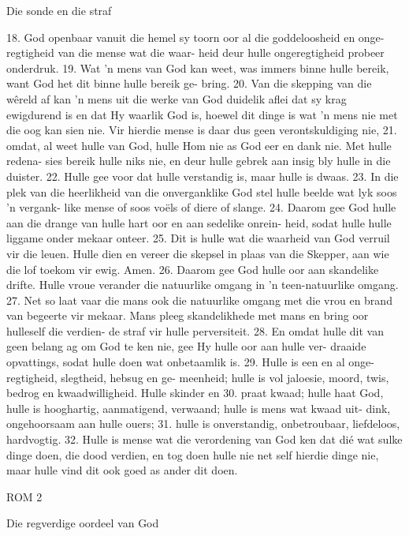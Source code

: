 Die sonde en die straf

18.  God openbaar vanuit die hemel sy
toorn oor al die goddeloosheid en onge-
regtigheid van die mense wat die waar-
heid deur hulle ongeregtigheid probeer
onderdruk.  19.  Wat 'n mens van God kan 
weet, was immers binne hulle bereik,
want God het dit binne hulle bereik ge-
bring.  20.  Van die skepping van die wêreld
af kan 'n mens uit die werke van God 
duidelik aflei dat sy krag ewigdurend is
en dat Hy waarlik God is, hoewel dit 
dinge is wat 'n mens nie met die oog kan
sien nie.  Vir hierdie mense is daar dus
geen verontskuldiging nie, 21.  omdat, al 
weet hulle van God, hulle Hom nie as 
God eer en dank nie.  Met hulle redena-
sies bereik hulle niks nie, en deur hulle
gebrek aan insig bly hulle in die duister.
22.  Hulle gee voor dat hulle verstandig is,
maar hulle is dwaas.  23.  In die plek van die
heerlikheid van die onverganklike God 
stel hulle beelde wat lyk soos 'n vergank-
like mense of soos voëls of diere of slange.
24.  Daarom gee God hulle aan die drange
van hulle hart oor en aan sedelike onrein-
heid, sodat hulle hulle liggame onder 
mekaar onteer.  25.  Dit is hulle wat die 
waarheid van God verruil vir die leuen.
Hulle dien en vereer die skepsel in plaas
van die Skepper, aan wie die lof toekom
vir ewig.  Amen.  26.  Daarom gee God hulle
oor aan skandelike drifte.  Hulle vroue
verander die natuurlike omgang in 'n 
teen-natuurlike omgang.  27.  Net so laat 
vaar die mans ook die natuurlike omgang 
met die vrou en brand van begeerte vir 
mekaar.  Mans pleeg skandelikhede met
mans en bring oor hulleself die verdien-
de straf vir hulle perversiteit.  28.  En omdat
hulle dit van geen belang ag om God te
ken nie, gee Hy hulle oor aan hulle ver-
draaide opvattings, sodat hulle doen wat
onbetaamlik is.  29.  Hulle is een en al onge-
regtigheid, slegtheid, hebsug en ge-
meenheid; hulle is vol jaloesie, moord,
twis, bedrog en kwaadwilligheid.  Hulle
skinder en 30.  praat kwaad; hulle haat 
God, hulle is hooghartig, aanmatigend, 
verwaand; hulle is mens wat kwaad uit-
dink, ongehoorsaam aan hulle ouers;
31.  hulle is onverstandig, onbetroubaar,
liefdeloos, hardvogtig.  32.  Hulle is mense 
wat die verordening van God ken dat dié
wat sulke dinge doen, die dood verdien,
en tog doen hulle nie net self hierdie dinge
nie, maar hulle vind dit ook goed as ander
dit doen.

ROM 2

Die regverdige oordeel van God

